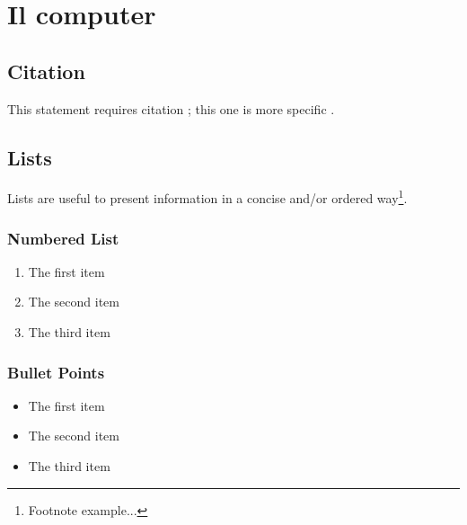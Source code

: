 \documentclass[11pt,fleqn,a5paper]{book} %
\begin{document}
    	\chapter{Il computer}
    	\label{cap: Il computer}
    		
    			
        
    
        \section{Citation}
    
        This statement requires citation \cite{book_key}; this one is more specific \cite[122]{article_key}.
    
    
    \section{Lists}
    
    Lists are useful to present information in a concise and/or ordered way\footnote{Footnote example...}.
    
    \subsection{Numbered List}
    
    \begin{enumerate}
    \item The first item
    \item The second item
    \item The third item
    \end{enumerate}
    
    \subsection{Bullet Points}
    
    \begin{itemize}
    \item The first item
    \item The second item
    \item The third item
    \end{itemize}
    
\end{document}
